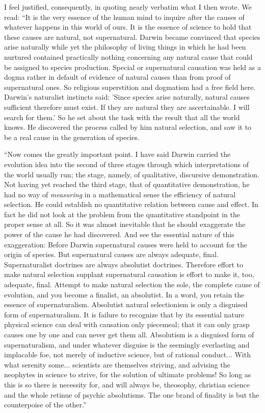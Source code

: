 \documentclass[a4paper, 11pt, oneside, polutonikogreek, english]{article}
\begin{document}
I feel justified, consequently, in quoting nearly verbatim what I then wrote. We read: ``It is the very essence of the human mind to inquire after the causes of whatever happens in this world of ours. It is the essence of science to hold that these causes are natural, not supernatural. Darwin became convinced that species arise naturally while yet the philosophy of living things in which he had been nurtured contained practically nothing concerning any natural cause that could be assigned to species production. Special or supernatural causation was held as a dogma rather in default of evidence of natural causes than from proof of supernatural ones. So religious superstition and dogmatism had a free field here. Darwin's naturalist instincts said: 'Since species arise naturally, natural causes sufficient therefore must exist. If they are natural they are ascertainable. I will search for them.' So he set about the task with the result that all the world knows. He discovered the process called by him natural selection, and saw it to be a real cause in the generation of species.

``Now comes the greatly important point. I have said Darwin carried the evolution idea into the second of three stages through which interpretations of the world usually run; the stage, namely, of qualitative, discursive demonstration. Not having yet reached the third stage, that of quantitative demonstration, he had no way of \emph{measuring} in a mathematical sense the efficiency of natural selection. He could establish no quantitative relation between cause and effect. In fact he did not look at the problem from the quantitative standpoint in the proper sense at all. So it was almost inevitable that he should exaggerate the power of the cause he had discovered. And see the essential nature of this exaggeration: Before Darwin supernatural causes were held to account for the origin of species. But supernatural causes are always adequate, final. Supernaturalist doctrines are always absolutist doctrines. Therefore effort to make natural selection supplant supernatural causation is effort to make it, too, adequate, final. Attempt to make natural selection the sole, the complete cause of evolution, and you become a finalist, an absolutist. In a word, you retain the essence of supernaturalism. Absolutist natural selectionism is only a disguised form of supernaturalism. It is failure to recognize that by its essential nature physical science can deal with causation only piecemeal; that it can only grasp causes one by one and can never get them all. Absolutism is a disguised form of supernaturalism, and under whatever disguise is the seemingly everlasting and implacable foe, not merely of inductive science, but of rational conduct... With what serenity some... scientists are themselves striving, and advising the neophytes in science to strive, for the solution of ultimate problems! So long as this is so there is necessity for, and will always be, theosophy, christian science and the whole retinue of psychic absolutisms. The one brand of finality is but the counterpoise of the other.''
\end{document}
